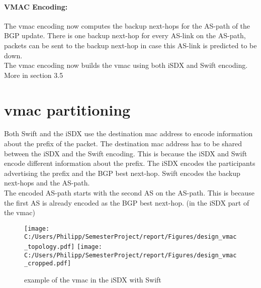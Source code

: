 \paragraph{\label{chapter3:Changes to the iSDX:Vmac Encoding}VMAC Encoding:}
The vmac encoding now computes the backup next-hops for the AS-path of the BGP update. There is one backup next-hop for every AS-link on the AS-path, packets can be sent to the backup next-hop in case this AS-link is predicted to be down. \\
The vmac encoding now builds the vmac using both iSDX and Swift encoding. \\
More in section 3.5 

\section{\label{chapter3:vmac partitioning}vmac partitioning}

Both Swift and the iSDX use the destination mac address to encode information about the prefix of the packet. The destination mac address has to be shared between the iSDX and the Swift encoding. This is because the iSDX and Swift encode different information about the prefix. The iSDX encodes the participants advertising the prefix and the BGP best next-hop. Swift encodes the backup next-hops and the AS-path. \\
The encoded AS-path starts with the second AS on the AS-path. This is because the first AS is already encoded as the BGP best next-hop. (in the iSDX part of the vmac)
\begin{figure}[h]
\center
\texttt{[image: C:/Users/Philipp/SemesterProject/report/Figures/design\_vmac\_topology.pdf]}
\texttt{[image: C:/Users/Philipp/SemesterProject/report/Figures/design\_vmac\_cropped.pdf]}
\caption{example of the vmac in the iSDX with Swift}
\end{figure}

\newpage

